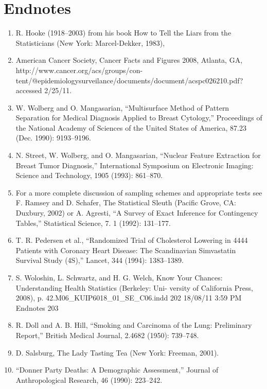 \documentclass[
]{report}
\begin{document}
\begin{list}{E.}{ \setlength{\itemsep}{0.5em}}
\end{list}

\section*{Endnotes}\label{endnotes}

\begin{enumerate}

\item R. Hooke (1918–2003) from his book How to Tell the Liars from the Statisticians (New York: Marcel-Dekker, 1983),
\item American Cancer Society, Cancer Facts and Figures 2008, Atlanta, GA, http://www.cancer.org/acs/groups/con-
tent/@epidemiologysurveilance/documents/document/acspc026210.pdf? accessed 2/25/11.
\item W. Wolberg and O. Mangasarian, “Multisurface Method of Pattern Separation for Medical Diagnosis Applied to
Breast Cytology,” Proceedings of the National Academy of Sciences of the United States of America, 87.23 (Dec.
1990): 9193–9196.
\item N. Street, W. Wolberg, and O. Mangasarian, “Nuclear Feature Extraction for Breast Tumor Diagnosis,” International
Symposium on Electronic Imaging: Science and Technology, 1905 (1993): 861–870.
\item For a more complete discussion of sampling schemes and appropriate tests see F. Ramsey and D. Schafer, The
Statistical Sleuth (Pacific Grove, CA: Duxbury, 2002) or A. Agresti, “A Survey of Exact Inference for Contingency
Tables,” Statistical Science, 7. 1 (1992): 131–177.
\item T. R. Pedersen et al., “Randomized Trial of Cholesterol Lowering in 4444 Patients with Coronary Heart Disease:
The Scandinavian Simvastatin Survival Study (4S),” Lancet, 344 (1994): 1383–1389.
\item S. Woloshin, L. Schwartz, and H. G. Welch, Know Your Chances: Understanding Health Statistics (Berkeley: Uni-
versity of California Press, 2008), p. 42.M06\_KUIP6018\_01\_SE\_C06.indd 202 18/08/11 3:59 PM Endnotes 203
\item R. Doll and A. B. Hill, “Smoking and Carcinoma of the Lung: Preliminary Report,” British Medical Journal, 2.4682
(1950): 739–748.
\item D. Salsburg, The Lady Tasting Tea (New York: Freeman, 2001).
\item “Donner Party Deaths: A Demographic Assessment,” Journal of Anthropological Research, 46 (1990): 223–242.

\end{enumerate}
\end{document}
